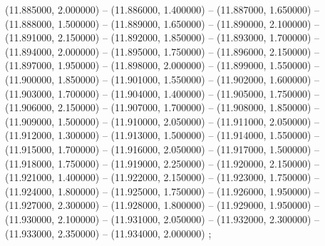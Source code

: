 (11.885000, 2.000000) -- 
(11.886000, 1.400000) -- 
(11.887000, 1.650000) -- 
(11.888000, 1.500000) -- 
(11.889000, 1.650000) -- 
(11.890000, 2.100000) -- 
(11.891000, 2.150000) -- 
(11.892000, 1.850000) -- 
(11.893000, 1.700000) -- 
(11.894000, 2.000000) -- 
(11.895000, 1.750000) -- 
(11.896000, 2.150000) -- 
(11.897000, 1.950000) -- 
(11.898000, 2.000000) -- 
(11.899000, 1.550000) -- 
(11.900000, 1.850000) -- 
(11.901000, 1.550000) -- 
(11.902000, 1.600000) -- 
(11.903000, 1.700000) -- 
(11.904000, 1.400000) -- 
(11.905000, 1.750000) -- 
(11.906000, 2.150000) -- 
(11.907000, 1.700000) -- 
(11.908000, 1.850000) -- 
(11.909000, 1.500000) -- 
(11.910000, 2.050000) -- 
(11.911000, 2.050000) -- 
(11.912000, 1.300000) -- 
(11.913000, 1.500000) -- 
(11.914000, 1.550000) -- 
(11.915000, 1.700000) -- 
(11.916000, 2.050000) -- 
(11.917000, 1.500000) -- 
(11.918000, 1.750000) -- 
(11.919000, 2.250000) -- 
(11.920000, 2.150000) -- 
(11.921000, 1.400000) -- 
(11.922000, 2.150000) -- 
(11.923000, 1.750000) -- 
(11.924000, 1.800000) -- 
(11.925000, 1.750000) -- 
(11.926000, 1.950000) -- 
(11.927000, 2.300000) -- 
(11.928000, 1.800000) -- 
(11.929000, 1.950000) -- 
(11.930000, 2.100000) -- 
(11.931000, 2.050000) -- 
(11.932000, 2.300000) -- 
(11.933000, 2.350000) -- 
(11.934000, 2.000000) ;
